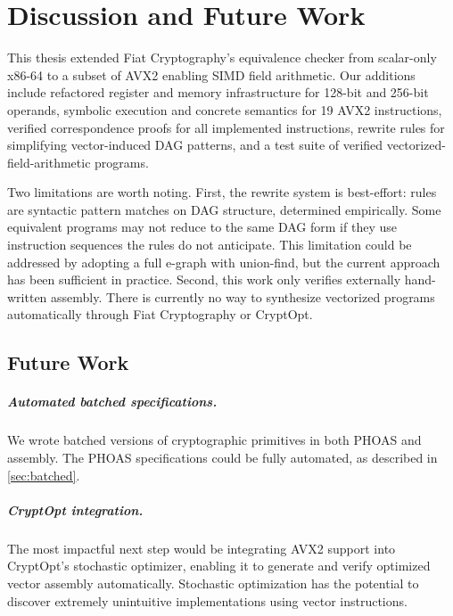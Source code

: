 \chapter{Discussion and Future Work}
\label{ch:discussion}

This thesis extended Fiat Cryptography's equivalence checker from scalar-only x86-64 to a subset of AVX2 enabling SIMD field arithmetic.
Our additions include refactored register and memory infrastructure for 128-bit and 256-bit operands, symbolic execution and concrete semantics for 19 AVX2 instructions, verified correspondence proofs for all implemented instructions, rewrite rules for simplifying vector-induced DAG patterns, and a test suite of verified vectorized-field-arithmetic programs.

Two limitations are worth noting.
First, the rewrite system is best-effort: rules are syntactic pattern matches on DAG structure, determined empirically.
Some equivalent programs may not reduce to the same DAG form if they use instruction sequences the rules do not anticipate.
This limitation could be addressed by adopting a full e-graph with union-find, but the current approach has been sufficient in practice.
Second, this work only verifies externally hand-written assembly. There is currently no way to synthesize vectorized programs automatically through Fiat Cryptography or CryptOpt.

\section{Future Work}

\paragraph{Automated batched specifications.}
We wrote batched versions of cryptographic primitives in both PHOAS and assembly. 
The PHOAS specifications could be fully automated, as described in \autoref{sec:batched}.

\paragraph{CryptOpt integration.}
The most impactful next step would be integrating AVX2 support into CryptOpt's stochastic optimizer, enabling it to generate and verify optimized vector assembly automatically.
Stochastic optimization has the potential to discover extremely unintuitive implementations using vector instructions.

